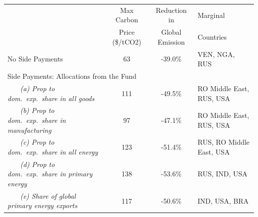 \begin{center}
\small
\setlength{\tabcolsep}{4pt}
\renewcommand{\arraystretch}{1.25}
\begin{tabular}{l cc l}
\hline
 & Max Carbon & Reduction in  & Marginal \\
 & Price (\$/tCO2) & Global Emission & Countries \\
\hline
 No Side Payments & 63 & -39.0\% & VEN, NGA, RUS \\
\multicolumn{4}{l}{Side Payments: Allocations from the Fund} \\
 ~~~ \textit{(a) Prop to dom.\ exp.\ share in all goods} & 111 & -49.5\% & RO Middle East, RUS, USA \\
 ~~~ \textit{(b) Prop to dom.\ exp.\ share in manufacturing} & 97 & -47.1\% & RO Middle East, RUS, USA \\
 ~~~ \textit{(c) Prop to dom.\ exp.\ share in all energy} & 123 & -51.4\% & RUS, RO Middle East, USA \\
 ~~~ \textit{(d) Prop to dom.\ exp.\ share in primary energy} & 138 & -53.6\% & RUS, IND, USA \\
 ~~~ \textit{(e) Share of global primary energy exports} & 117 & -50.6\% & IND, USA, BRA \\
\hline
\end{tabular}
\end{center}
